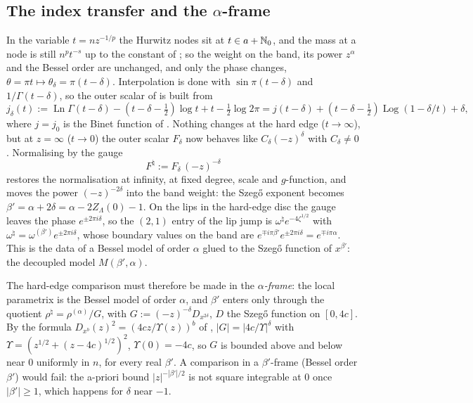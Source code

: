 \subsection{The index transfer and the \texorpdfstring{$\alpha$}{alpha}-frame}\label{sec:H-mechanism}
In the variable $t=nz^{-1/p}$ the Hurwitz nodes sit at $t\in a+\mathbb{N}_0$, and the mass at a node is still $n^{p}t^{-s}$ up to the
constant of \cite{PaperII}; so the weight on the band, its power $z^\alpha$ and the Bessel order are unchanged, and only the phase
changes, $\theta=\pi t\mapsto\theta_\delta=\pi(t-\delta)$. Interpolation is done with $\sin\pi(t-\delta)$ and $1/\Gamma(t-\delta)$, so the
outer scalar of \cite{PaperII} is built from
\[
  j_\delta(t):=\operatorname{Ln}\Gamma(t-\delta)-(t-\delta-\tfrac12)\log t+t-\tfrac12\log2\pi
  =j(t-\delta)+(t-\delta-\tfrac12)\operatorname{Log}(1-\delta/t)+\delta ,
\]
where $j=j_0$ is the Binet function of \cite{PaperII}. Nothing changes at the hard edge ($t\to\infty$), but at $z=\infty$ ($t\to0$) the
outer scalar $F_\delta$ now behaves like $C_\delta(-z)^{\delta}$ with $C_\delta\ne0$. Normalising by the gauge
\[
  F^\natural:=F_\delta\,(-z)^{-\delta}
\]
restores the normalisation at infinity, at fixed degree, scale and $g$-function, and moves the power $(-z)^{-2\delta}$ into the
band weight: the Szeg\H{o} exponent becomes $\beta'=\alpha+2\delta=\alpha-2Z_\Lambda(0)-1$. On the lips in the hard-edge disc the
gauge leaves the phase $e^{\pm2\pi i\delta}$, so the $(2,1)$ entry of the lip jump is $\omega^\natural e^{-4\zeta^{1/2}}$ with
$\omega^\natural=\omega^{(\beta')}e^{\pm2\pi i\delta}$, whose boundary values on the band are $e^{\mp i\pi\beta'}e^{\pm2\pi i\delta}=e^{\mp i\pi\alpha}$.
This is the data of a Bessel model of order $\alpha$ glued to the Szeg\H{o} function of $x^{\beta'}$: the decoupled model
$M(\beta',\alpha)$.

The hard-edge comparison must therefore be made in the \emph{$\alpha$-frame}: the local parametrix is the Bessel model of
order $\alpha$, and $\beta'$ enters only through the quotient $\rho^\natural=\rho^{(\alpha)}/G$, with
$G:=(-z)^{-\delta}D_{x^{2\delta}}$, $D$ the Szeg\H{o} function on $[0,4c]$. By the formula $D_{x^{b}}(z)^2=(4cz/\Upsilon(z))^{b}$ of \cite{PaperII},
$|G|=|4c/\Upsilon|^\delta$ with $\Upsilon=(z^{1/2}+(z-4c)^{1/2})^2$, $\Upsilon(0)=-4c$, so $G$ is bounded above and below near $0$
uniformly in $n$, for every real $\beta'$. A comparison in a $\beta'$-frame (Bessel order $\beta'$) would fail: the a-priori bound
$|z|^{-|\beta'|/2}$ is not square integrable at $0$ once $|\beta'|\ge1$, which happens for $\delta$ near $-1$.

